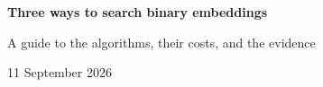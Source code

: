 \documentclass[12pt,a4paper]{article}
\begin{document}
{\Large\bfseries\color{Ink} Three ways to search binary embeddings}\par
{\large A guide to the algorithms, their costs, and the evidence}\par
{\small 11 September 2026}\par\medskip






\end{document}
